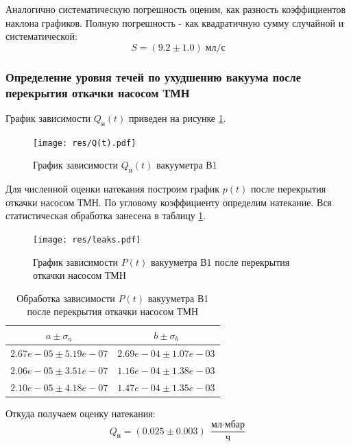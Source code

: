 \documentclass[12pt,a4paper]{article}
\begin{document}
	Аналогично систематическую погрешность оценим, как разность коэффициентов наклона графиков. Полную погрешность - как квадратичную сумму случайной и систематической:
	$$S = (9.2 \pm 1.0) \; \text{мл}/\text{с}$$
	
	\subsubsection*{Определение уровня течей по ухудшению вакуума после перекрытия откачки насосом ТМН}
	График зависимости $Q_{\text{н}}(t)$ приведен на рисунке \ref{fig:Q(t)}. 
	\begin{figure}[H]
		\caption{График зависимости $Q_{\text{н}}(t)$ вакууметра В1}
		\label{fig:Q(t)}
		\centering
		\texttt{[image: res/Q(t).pdf]}
	\end{figure}
	
	Для численной оценки натекания построим график $p(t)$ после перекрытия откачки насосом ТМН.
	По угловому коэффициенту определим натекание. Вся статистическая обработка занесена в таблицу \ref{tab:natek}.
	
	\begin{figure}[H]
		\caption{График зависимости $P(t)$ вакууметра В1 после перекрытия откачки насосом ТМН}
		\label{fig:natek}
		\centering
		\texttt{[image: res/leaks.pdf]}
	\end{figure}
	
	\begin{table}[H]	
		\caption{Обработка зависимости $P(t)$ вакууметра В1 после перекрытия откачки насосом ТМН}
		\label{tab:natek}
		\centering
		\footnotesize
		\begin{tabular}{cc}
			\toprule
			$a \pm \sigma_a$ & $b \pm \sigma_b$ \\
			\midrule
			$2.67e-05 \pm 5.19e-07$     &    $2.69e-04 \pm 1.07e-03$ \\
			$2.06e-05 \pm 3.51e-07$     &    $1.16e-04 \pm 1.38e-03$ \\
			$2.10e-05 \pm 4.18e-07$     &    $1.47e-04 \pm 1.35e-03$ \\
			\bottomrule
		\end{tabular}
	\end{table}
	
	Откуда получаем оценку натекания: 
	$$Q_{\text{н}} = (0.025 \pm 0.003) \; \frac{\text{мл}\cdot\text{мбар}}{\text{ч}}$$
	
\end{document}
